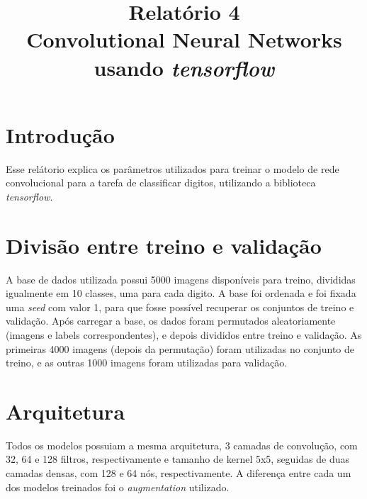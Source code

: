 \documentclass[conference]{IEEEtran}
\begin{document}
\title{%
  Relatório 4 \\
  \large Convolutional Neural Networks \\
    usando \textit{tensorflow}}

\author{
}


\maketitle

\section{Introdução}
Esse relátorio explica os parâmetros utilizados para treinar o modelo de rede convolucional para a tarefa de classificar digitos, utilizando a biblioteca \textit{tensorflow}.


\section{Divisão entre treino e validação}
A base de dados utilizada possui 5000 imagens disponíveis para treino, divididas igualmente em 10 classes, uma para cada digito. A base foi ordenada e foi fixada uma \textit{seed} com valor 1, para que fosse possível recuperar os conjuntos de treino e validação. Após carregar a base, os dados foram permutados aleatoriamente (imagens e labels correspondentes), e depois divididos entre treino e validação. As primeiras 4000 imagens (depois da permutação) foram utilizadas no conjunto de treino, e as outras 1000 imagens foram utilizadas para validação.

\section{Arquitetura}
Todos os modelos possuiam a mesma arquitetura, 3 camadas de convolução, com 32, 64 e 128 filtros, respectivamente e tamanho de kernel 5x5, seguidas de duas camadas densas, com 128 e 64 nós, respectivamente. A diferença entre cada um dos modelos treinados foi o \textit{augmentation} utilizado.
\end{document}
